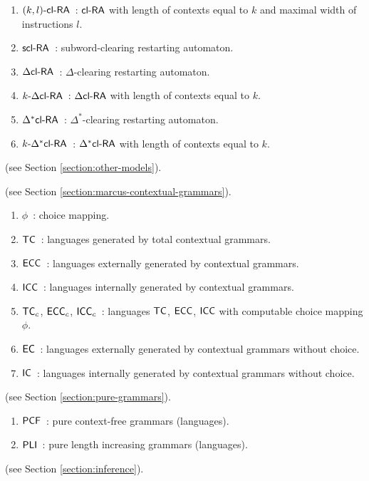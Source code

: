 \begin{enumerate}[]
\item $\textup{\sf $(k,l)$-\textup{\sf cl-RA\/}}$\ : $\textup{\sf cl-RA\/}$ with length of contexts equal to $k$ and maximal width of instructions $l$.
\item $\textup{\sf scl-RA}$\ : subword-clearing restarting automaton.
\item $\textup{\sf $\Delta$cl-RA\/}$\ : $\Delta$-clearing restarting automaton.
\item $\textup{\sf $k$-\textup{\sf $\Delta$cl-RA\/}}$\ : $\textup{\sf $\Delta$cl-RA\/}$ with length of contexts equal to $k$.
\item $\textup{\sf $\Delta^*$cl-RA\/}$\ : $\Delta^*$-clearing restarting automaton.
\item $\textup{\sf $k$-\textup{\sf $\Delta^*$cl-RA\/}}$\ : $\textup{\sf $\Delta^*$cl-RA\/}$ with length of contexts equal to $k$. 
\end{enumerate}

 (see Section \ref{section:other-models}).

 (see Section \ref{section:marcus-contextual-grammars}).

\begin{enumerate}[]
\item $\phi$\ : choice mapping.
\item $\textup{\sf TC}$\ : languages generated by total contextual grammars.
\item $\textup{\sf ECC}$\ : languages externally generated by contextual grammars.
\item $\textup{\sf ICC}$\ : languages internally generated by contextual grammars.
\item $\textup{\sf TC}_c$, $\textup{\sf ECC}_c$, $\textup{\sf ICC}_c$\ : languages $\textup{\sf TC}$, $\textup{\sf ECC}$, $\textup{\sf ICC}$ with computable choice mapping $\phi$.
\item $\textup{\sf EC}$\ : languages externally generated by contextual grammars without choice.
\item $\textup{\sf IC}$\ : languages internally generated by contextual grammars without choice.
\end{enumerate}

 (see Section \ref{section:pure-grammars}).

\begin{enumerate}[]
\item $\textup{\sf PCF}$\ : pure context-free grammars (languages).
\item $\textup{\sf PLI}$\ : pure length increasing grammars (languages).
\end{enumerate}

 (see Section \ref{section:inference}).

